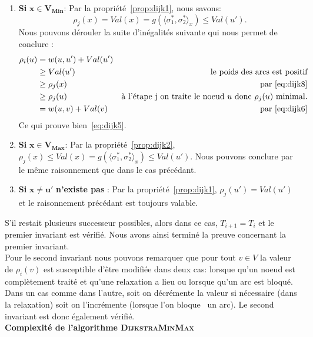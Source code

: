 \begin{enumerate}
\begin{enumerate}
	\item \textbf{Si }$\mathbf{x \in V_{Min}}$: Par la propriété~\ref{prop:dijk1}, nous savons:
	 \begin{equation}
		\label{eq:dijk8}\rho_j(x) = Val(x) = g(\langle \sigma_1^*, \sigma_2^* \rangle_x) \leq Val(u') .
	\end{equation}
	Nous pouvons dérouler la suite d'inégalités suivante qui nous permet de conclure : 
	\begin{align*}
		\rho_i(u) &= w(u,u') + Val(u')\\
		 		  &\geq Val(u') & \text{le poids des arcs est positif} \\
				  &\geq \rho_j(x) & \text{par}~\eqref{eq:dijk8} \\
				  &\geq \rho_j(u) & \text{à l'étape j on traite le noeud } u \text{ donc } \rho_j(u) \text{ minimal.}\\
				  &= w(u,v) + Val(v) & \text{par}~\eqref{eq:dijk6}						
	\end{align*}
	Ce qui prouve bien~\eqref{eq:dijk5}.
	\item \textbf{Si }$\mathbf{x \in V_{Max}}$:	 Par la propriété~\ref{prop:dijk2}, $\rho_j(x) \leq Val(x) = g(\langle \sigma_1^*, \sigma_2^* \rangle_x) \leq Val(u') $. Nous pouvons conclure par le même raisonnement que dans le cas précédant.
	\item \textbf{Si }$\mathbf{x \neq u'}$\textbf{ n'existe pas }: Par la propriété~\ref{prop:dijk1}, $\rho_j(u') = Val(u')$ et le raisonnement précédant est toujours valable.
\end{enumerate}
\end{enumerate}

S'il restait plusieurs successeur possibles, alors dans ce cas, $T_{i+1} = T_i$ et le premier invariant est vérifié.
Nous avons ainsi terminé la preuve concernant la premier invariant.\\

Pour le second invariant nous pouvons remarquer que pour tout $v \in V$ la valeur de $\rho_i(v)$ est susceptible d'être modifiée dans deux cas:  lorsque qu'un noeud est complètement traité et qu'une relaxation a lieu ou lorsque qu'un arc est bloqué. Dans un cas comme dans l'autre, soit on décrémente la valeur si nécessaire (dans la relaxation) soit on l'incrémente (lorsque l'on \og bloque \fg~un arc). Le second invariant est donc également vérifié. \\

\noindent\textbf{Complexité de l'algorithme \textsc{DijkstraMinMax}}\\

